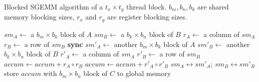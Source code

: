 \begin{algorithm}
  \caption{Blocked SGEMM algorithm of a $t_x \times t_y$ thread block. $b_m, b_n, b_k$ are shared memory blocking sizes, $r_x$ and $r_y$ are register blocking sizes.}
  \label{gemm}
  {\footnotesize
  \begin{algorithmic}[1]
	\State $sm_A \gets$ a $b_m \times b_k$ block of $A$
	\State $sm_B \gets$ a $b_k \times b_n$ block of $B$
    \State $r_A \gets $ a column of $sm_A$%
    \State $r_B \gets $ a row of $sm_B$%
	\Do
	\State \textbf{sync}
	\State $sm'_A \gets$ another $b_m \times b_k$ block of $A$
	\State $sm'_B \gets$ another $b_k \times b_n$ block of $B$
		\State $r'_A \gets$ a column of $sm_A$ %
		\State $r'_B \gets$ a row of $sm_B$%
        \State $accum \gets accum + r_A \circ r_B$
        \Else
        \State $accum \gets accum + r'_A \circ r'_B$
        \EndIf
	\EndFor
      \State $sm_A \leftrightarrow sm'_A$; $sm_B \leftrightarrow sm'_B$ 
      \State store $accum$ with $b_m \times b_n$ block of $C$ to global memory %
  \end{algorithmic}
  }
\end{algorithm}

